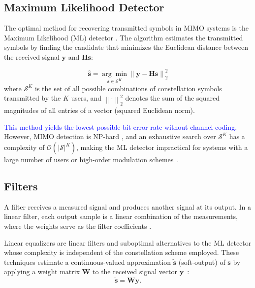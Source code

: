\subsection{Maximum Likelihood Detector}\label{subsubsec:ml}
The optimal method for recovering transmitted symbols in MIMO systems is the
Maximum Likelihood (ML) detector \cite{wang2021tlbdinsa}. The algorithm estimates the transmitted
symbols by finding
the candidate that minimizes the Euclidean distance between the received
signal $\mathbf{y}$ and $\mathbf{H}\mathbf{s}$:

\begin{equation}
\hat{\mathbf{s}} = \underset{\mathbf{s} \in \mathcal{S}^{K}}{\arg\min}
\left\|\mathbf{y} - \mathbf{H}\mathbf{s}\right\|_2^2
\label{eq:ml}
\end{equation}
where $\mathcal{S}^{K}$ is the set of all possible combinations of
constellation symbols transmitted by the $K$ users, and
$\left\|\cdot\right\|_2^2$ denotes the sum
of the squared magnitudes of all entries of a vector (squared Euclidean norm).

\textcolor{blue}{This method yields the lowest possible bit error rate without channel coding.} However, MIMO detection is NP-hard \cite{zero-forcing}, and an exhaustive search over $\mathcal{S}^{K}$ has a complexity of $\mathcal{O}(|\mathcal{S}|^K)$, making the ML detector impractical for systems with a large number of
users or high-order modulation schemes~\cite{bello2022algorithms}.

\subsection{Filters}\label{subsec:filtros}\label{subsubsec:wiener}

A filter receives a measured signal and produces another signal at its output. In a linear filter, each output sample is a linear combination of the measurements, where the weights serve as the filter coefficients \cite{oppenheim2010wiener}.

Linear equalizers are linear filters and suboptimal alternatives to the ML detector whose
complexity is independent of the constellation scheme employed. These
techniques estimate a continuous-valued approximation $\tilde{\mathbf{s}}$
(soft-output) of $\mathbf{s}$ by applying a weight matrix $\mathbf{W}$ to
the received signal vector $\mathbf{y}$~\cite{rodriguezsanchez2020}:
\begin{equation}\label{eq:filtro}
\tilde{\mathbf s}=\mathbf W\mathbf y.
\end{equation}

